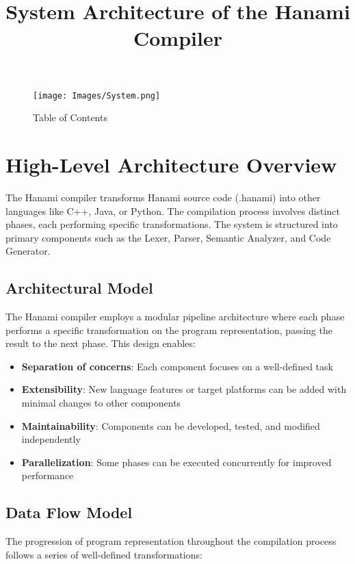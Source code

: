 \documentclass[12pt,a4paper]{article}
\title{\textbf{System Architecture of the Hanami Compiler}}
\begin{document}
\maketitle

\begin{figure}[H]
    \centering
    \texttt{[image: Images/System.png]}
    \caption{Table of Contents}
    \label{fig:contents}
\end{figure}

\newpage

\section{High-Level Architecture Overview}

The Hanami compiler transforms Hanami source code (.hanami) into other languages like C++, Java, or Python. The compilation process involves distinct phases, each performing specific transformations. The system is structured into primary components such as the Lexer, Parser, Semantic Analyzer, and Code Generator.

\subsection{Architectural Model}

The Hanami compiler employs a modular pipeline architecture where each phase performs a specific transformation on the program representation, passing the result to the next phase. This design enables:

\begin{itemize}
    \item \textbf{Separation of concerns}: Each component focuses on a well-defined task
    \item \textbf{Extensibility}: New language features or target platforms can be added with minimal changes to other components
    \item \textbf{Maintainability}: Components can be developed, tested, and modified independently
    \item \textbf{Parallelization}: Some phases can be executed concurrently for improved performance
\end{itemize}
\subsection{Data Flow Model}

The progression of program representation throughout the compilation process follows a series of well-defined transformations:
\end{document}
